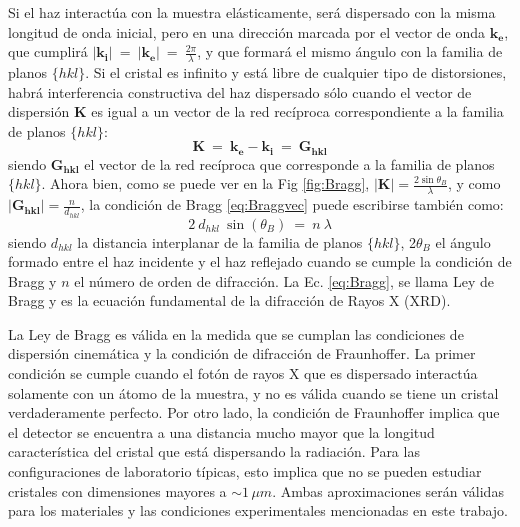 Si el haz interactúa con la muestra elásticamente, será dispersado con la misma longitud de onda inicial, pero en una dirección marcada por el vector de onda $\mathbf{k_e}$, que cumplirá $\lvert \mathbf{k_i} \rvert \ = \ \lvert \mathbf{k_e} \rvert \ = \ \frac{2\pi}{\lambda}$, y que formará el mismo ángulo con la familia de planos $\{hkl\}$.
Si el cristal es infinito y está libre de cualquier tipo de distorsiones, habrá interferencia constructiva del haz dispersado sólo cuando el vector de dispersión $\mathbf{K}$ es igual a un vector de la red recíproca correspondiente a la familia de planos $\{hkl\}$:
\begin{equation}
  \mathbf{K} \ = \ \mathbf{k_e} - \mathbf{k_i} \ = \ \mathbf{G_{hkl}}
  \label{eq:Braggvec}
\end{equation}
\noindent
siendo $\mathbf{G_{hkl}}$ el vector de la red recíproca que corresponde a la familia de planos $\{hkl\}$.
Ahora bien, como se puede ver en la Fig \ref{fig:Bragg}, $\displaystyle \lvert \mathbf{K} \rvert = \frac{2\sin\theta_B}{\lambda}$, y como $\displaystyle\lvert \mathbf{G_{hkl}} \rvert = \frac{n}{d_{hkl}}$, la condición de Bragg \ref{eq:Braggvec} puede escribirse también como:
\begin{equation}
  2 \ d_{hkl} \ \sin(\theta_{B}) \ = \ n \ \lambda
  \label{eq:Bragg}
\end{equation}
\noindent
siendo $d_{hkl}$ la distancia interplanar de la familia de planos $\{hkl\}$, 2$\theta_{B}$ el ángulo formado entre el haz incidente y el haz reflejado cuando se cumple la condición de Bragg y $n$ el número de orden de difracción. La Ec. \ref{eq:Bragg}, se llama Ley de Bragg y es la ecuación fundamental de la difracción de Rayos X (XRD). 

La Ley de Bragg es válida en la medida que se cumplan las condiciones de dispersión cinemática y la condición de difracción de Fraunhoffer. 
La primer condición se cumple cuando el fotón de rayos X que es dispersado interactúa solamente con un átomo de la muestra, y no es válida cuando se tiene un cristal verdaderamente perfecto.
Por otro lado, la condición de Fraunhoffer implica que el detector se encuentra a una distancia mucho mayor que la longitud característica del cristal que está dispersando la radiación.
Para las configuraciones de laboratorio típicas, esto implica que no se pueden estudiar cristales con dimensiones mayores a $\sim 1\,\mu m$.
Ambas aproximaciones serán válidas para los materiales y las condiciones experimentales mencionadas en este trabajo.



